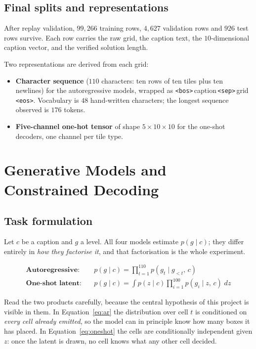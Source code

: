 \documentclass[11pt,a4paper]{report}
\begin{document}
\section{Final splits and representations}

After replay validation, $99{,}266$ training rows, $4{,}627$ validation rows and
$926$ test rows survive. Each row carries the raw grid, the caption text, the
$10$-dimensional caption vector, and the verified solution length.

Two representations are derived from each grid:

\begin{itemize}[leftmargin=1.5em,itemsep=1pt]
\item \textbf{Character sequence} ($110$ characters: ten rows of ten tiles plus
      ten newlines) for the autoregressive models, wrapped as
      \texttt{<bos>}\,caption\,\texttt{<sep>}\,grid\,\texttt{<eos>}. Vocabulary
      is $48$ hand-written characters; the longest sequence observed is $176$
      tokens.
\item \textbf{Five-channel one-hot tensor} of shape $5\times10\times10$ for the
      one-shot decoders, one channel per tile type.
\end{itemize}

\chapter{Generative Models and Constrained Decoding}
\label{ch:models}

\section{Task formulation}

Let $c$ be a caption and $g$ a level. All four models estimate $p(g \mid c)$;
they differ entirely in \emph{how they factorise it}, and that factorisation is
the whole experiment.

\begin{align}
\textbf{Autoregressive:}\quad & p(g \mid c) = \prod_{t=1}^{110}
   p(g_t \mid g_{<t},\, c) \label{eq:ar}\\[2pt]
\textbf{One-shot latent:}\quad & p(g \mid c) = \int p(z \mid c)
   \prod_{i=1}^{100} p(g_i \mid z,\, c)\; dz \label{eq:oneshot}
\end{align}

Read the two products carefully, because the central hypothesis of this project
is visible in them. In Equation~\ref{eq:ar} the distribution over cell $t$ is
conditioned on \emph{every cell already emitted}, so the model can in principle
know how many boxes it has placed. In Equation~\ref{eq:oneshot} the cells are
conditionally independent given $z$: once the latent is drawn, no cell knows
what any other cell decided.
\end{document}
